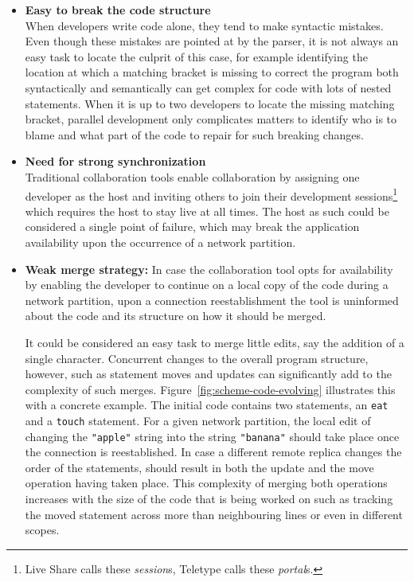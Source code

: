 \begin{itemize}
    \item \textbf{Easy to break the code structure} \\
    When developers write code alone, they tend to make syntactic mistakes.
    Even though these mistakes are pointed at by the parser, it is not always an easy task to locate the culprit of
    this case, for example identifying the location at which a matching bracket is missing to correct the program
    both syntactically and semantically can get complex for code with lots of nested statements.
    When it is up to two developers to locate the missing matching bracket, parallel development only complicates
    matters to identify who is to blame and what part of the code to repair for such breaking changes.

    \item \textbf{Need for strong synchronization} \\
    Traditional collaboration tools enable collaboration by assigning one developer as the host and inviting
    others to join their development sessions\footnote{
        Live Share calls these \emph{session}s, Teletype calls these \emph{portal}s.}
    which requires the host to stay live at all times.
    The host as such could be considered a single point of failure, which may break the application availability upon
    the occurrence of a network partition.

    \item \textbf{Weak merge strategy:}
    In case the collaboration tool opts for availability by enabling the developer to continue on a local copy of
    the code during a network partition, upon a connection reestablishment the tool is uninformed about the code and its
    structure on how it should be merged.

    It could be considered an easy task to merge little edits, say the addition of a single character.
    Concurrent changes to the overall program structure, however, such as statement moves and updates can significantly
    add to the complexity of such merges.
    Figure~\ref{fig:scheme-code-evolving} illustrates this with a concrete example.
    The initial code contains two statements, an \texttt{eat} and a \texttt{touch} statement.
    For a given network partition, the local edit of changing the \texttt{"apple"} string into the string
    \texttt{"banana"} should take place once the connection is reestablished.
    In case a different remote replica changes the order of the statements, should result in both the update and the
    move operation having taken place.
    This complexity of merging both operations increases with the size of the code that is being worked on such as
    tracking the moved statement across more than neighbouring lines or even in different scopes.
\end{itemize}

